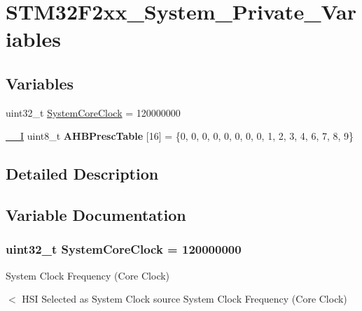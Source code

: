 \hypertarget{group___s_t_m32_f2xx___system___private___variables}{\section{S\-T\-M32\-F2xx\-\_\-\-System\-\_\-\-Private\-\_\-\-Variables}
\label{group___s_t_m32_f2xx___system___private___variables}
}
\subsection*{Variables}
\begin{DoxyCompactItemize}
\item 
uint32\-\_\-t \hyperlink{group___s_t_m32_f2xx___system___private___variables_gaa3cd3e43291e81e795d642b79b6088e6}{System\-Core\-Clock} = 120000000
\item 
\hypertarget{group___s_t_m32_f2xx___system___private___variables_gacdc3ef54c0704c90e69a8a84fb2d970d}{\hyperlink{group___c_m_s_i_s__core__definitions_gaf63697ed9952cc71e1225efe205f6cd3}{\-\_\-\-\_\-\-I} uint8\-\_\-t {\bfseries A\-H\-B\-Presc\-Table} \mbox{[}16\mbox{]} = \{0, 0, 0, 0, 0, 0, 0, 0, 1, 2, 3, 4, 6, 7, 8, 9\}}\label{group___s_t_m32_f2xx___system___private___variables_gacdc3ef54c0704c90e69a8a84fb2d970d}

\end{DoxyCompactItemize}


\subsection{Detailed Description}


\subsection{Variable Documentation}
\hypertarget{group___s_t_m32_f2xx___system___private___variables_gaa3cd3e43291e81e795d642b79b6088e6}{
\subsubsection[{System\-Core\-Clock}]{\setlength{\rightskip}{0pt plus 5cm}uint32\-\_\-t System\-Core\-Clock = 120000000}}\label{group___s_t_m32_f2xx___system___private___variables_gaa3cd3e43291e81e795d642b79b6088e6}
System Clock Frequency (Core Clock)

$<$ H\-S\-I Selected as System Clock source System Clock Frequency (Core Clock) 